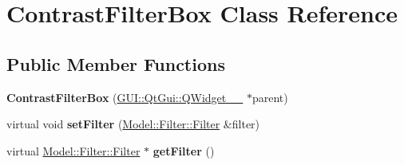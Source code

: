 \hypertarget{classGUI_1_1ContrastFilterBox}{}\section{Contrast\+Filter\+Box Class Reference}
\label{classGUI_1_1ContrastFilterBox}
\subsection*{Public Member Functions}
\begin{DoxyCompactItemize}
\item 
\hypertarget{classGUI_1_1ContrastFilterBox_a2694e245356367876509e5070d4b5687}{}{\bfseries Contrast\+Filter\+Box} (\hyperlink{classGUI_1_1QtGui_1_1QWidget____10}{G\+U\+I\+::\+Qt\+Gui\+::\+Q\+Widget\+\_\+\+\_} $\ast$parent)\label{classGUI_1_1ContrastFilterBox_a2694e245356367876509e5070d4b5687}

\item 
\hypertarget{classGUI_1_1ContrastFilterBox_ad7c0ee00fe3faac7942d75eec2a5342b}{}virtual void {\bfseries set\+Filter} (\hyperlink{classModel_1_1Filter_1_1Filter}{Model\+::\+Filter\+::\+Filter} \&filter)\label{classGUI_1_1ContrastFilterBox_ad7c0ee00fe3faac7942d75eec2a5342b}

\item 
\hypertarget{classGUI_1_1ContrastFilterBox_acef2029a93f4ab3a538cdb643b9c2613}{}virtual \hyperlink{classModel_1_1Filter_1_1Filter}{Model\+::\+Filter\+::\+Filter} $\ast$ {\bfseries get\+Filter} ()\label{classGUI_1_1ContrastFilterBox_acef2029a93f4ab3a538cdb643b9c2613}

\end{DoxyCompactItemize}
